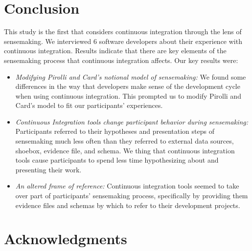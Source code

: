 \documentclass{sig-alternate}
\begin{document}
\section{Conclusion}
This study is the first that considers continuous integration through the lens of sensemaking. We interviewed 6 software developers about their experience with continuous integration. Results indicate that there are key elements of the sensemaking process that continuous integration affects. Our key results were:
\begin{itemize}  
	\item \textit{Modifying Pirolli and Card's notional model of sensemaking:} We found some differences in the way that developers make sense of the development cycle when using continuous integration. This prompted us to modify Pirolli and Card's model to fit our participants' experiences.
	\item \textit{Continuous Integration tools change participant behavior during sensemaking:} Participants referred to their hypotheses and presentation steps of sensemaking much less often than they referred to external data sources, shoebox, evidence file, and schema. We thing that continuous integration tools cause participants to spend less time hypothesizing about and presenting their work. 
	\item \textit{An altered frame of reference:} Continuous integration tools seemed to take over part of participants' sensemaking process, specifically by providing them evidence files and schemas by which to refer to their development projects.
\end{itemize}

\section{Acknowledgments}

%

%
%
\end{document}
